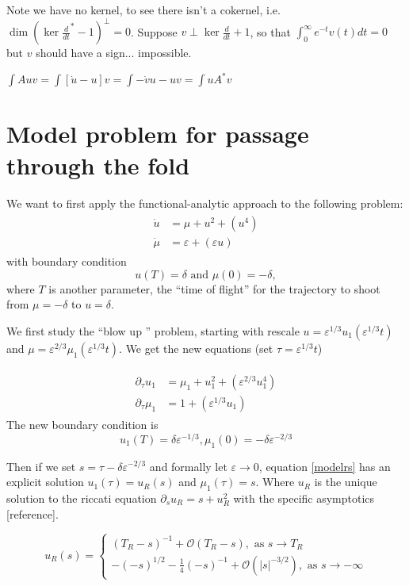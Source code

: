 \documentclass[letterpaper,11pt]{article}
\newcommand{\rmO}{\mathcal{O}}
\newcommand{\eps}{\varepsilon}
\numberwithin{equation}{section}
\theoremstyle{plain}
\begin{document}
Note we have no kernel, to see there isn't a cokernel, i.e. $\dim (\ker \frac{d}{dt}^*-1 )^\perp = 0$. Suppose $v \perp \ker \frac{d}{dt}+1$, so that $\int_0^{\infty} e^{-t} v(t)dt = 0 $ but $v$ should have a sign... impossible.
                                         

$\int Au v = \int [\dot{u}-u]v= \int  -\dot{v}u -uv=\int u A^*v$ 
\pagebreak


\section{Model problem for passage through the fold}
We want to first apply the functional-analytic approach to the following problem:
\begin{align}
\label{model}
\begin{split}
\dot{u} &= \mu+u^2 +(u^4)\\
\dot{\mu} &= \eps +(\eps u)
\end{split}
\end{align}
with boundary condition 
\begin{equation}\label{oBC}
u(T) = \delta \text{ and }\mu(0) =-\delta,
\end{equation}
 where $T$ is another parameter, the ``time of flight'' for the trajectory to shoot from $\mu = -\delta$ to $u = \delta$.

We first study the ``blow up '' problem, starting with rescale $ u = \eps^{1/3}u_1(\eps^{1/3}t)$ and $\mu = \eps^{2/3}\mu_1(\eps^{1/3}t)$. We get the new equations (set $\tau=\eps^{1/3}t$)

\begin{align}
\label{modelrs}
\begin{split}
\partial_\tau u_1 &= \mu_1+u_1^2 +(\eps^{2/3}u_1^4)\\
\partial_\tau \mu_1 &= 1 +(\eps^{1/3} u_1)
\end{split}
\end{align}
The new boundary condition is
\begin{equation}\label{BCs}
u_1(T) = \delta \eps^{-1/3}, \mu_1(0) = -\delta \eps^{-2/3}
\end{equation}

Then if we set $s = \tau - \delta\eps^{-2/3}$ and formally let $\eps \to 0$, equation \eqref{modelrs} has an explicit solution $u_1(\tau) = u_R(s)$ and $\mu_1(\tau) = s$. Where $u_R$ is the unique solution to the riccati equation $\partial_s u_R = s+u_R^2$ with the specific asymptotics [reference]. 

\begin{equation}
\label{ricasy}
u_R(s)=\begin{cases}
  (T_R-s)^{-1}+\rmO(T_R-s), \text{ as }s \to T_R \\
 -(-s)^{1/2} -\frac{1}{4}(-s)^{-1} + \rmO(|s|^{-3/2}), \text{ as }s \to -\infty
\end{cases}
\end{equation}
\end{document}

